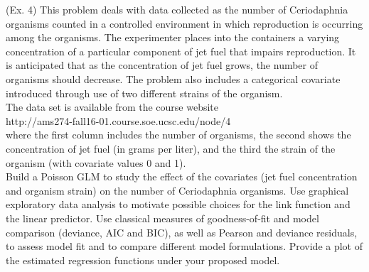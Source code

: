 \documentclass[]{article}
\begin{document}
\begin{enumerate}
{\item (Ex. 4)
This problem deals with data collected as the number of Ceriodaphnia organisms counted in a controlled environment in which reproduction is occurring among the organisms. The experimenter places into the containers a varying concentration of a particular component of jet fuel that impairs reproduction. It is anticipated that as the concentration of jet fuel grows, the number of organisms should decrease. The problem also includes a categorical covariate introduced through use of two different strains of the organism.\\
The data set is available from the course website\\
http://ams274-fall16-01.course.soe.ucsc.edu/node/4\\
where the first column includes the number of organisms, the second shows the concentration of jet fuel (in grams per liter), and the third the strain of the organism (with covariate values 0 and 1).\\
Build a Poisson GLM to study the effect of the covariates (jet fuel concentration and organism strain) on the number of Ceriodaphnia organisms. Use graphical exploratory data analysis to motivate possible choices for the link function and the linear predictor. Use classical measures of goodness-of-fit and model comparison (deviance, AIC and BIC), as well as Pearson and deviance residuals, to assess model fit and to compare different model formulations. Provide a plot of the estimated regression functions under your proposed model.

}
\end{enumerate}
\end{document}
